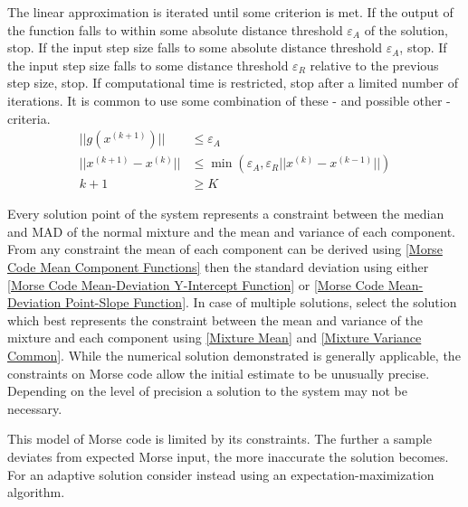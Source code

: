 \documentclass{article}
\begin{document}
The linear approximation is iterated until some criterion is met. If the output of the function falls to within some absolute distance threshold $\varepsilon_A$ of the solution, stop. If the input step size falls to some absolute distance threshold $\varepsilon_A$, stop. If the input step size falls to some distance threshold $\varepsilon_R$ relative to the previous step size, stop. If computational time is restricted, stop after a limited number of iterations. It is common to use some combination of these - and possible other - criteria.
%
\begin{align}\label{Newton's Method Stop Conditions}
||g(x^{(k+1)})|| &\leq \varepsilon_A \\
||x^{(k+1)} - x^{(k)}|| &\leq
    \min(\varepsilon_A, \varepsilon_R ||x^{(k)} - x^{(k-1)}||) \\
k + 1 &\geq K
\end{align}


Every solution point of the system represents a constraint between the median and MAD of the normal mixture and the mean and variance of each component. From any constraint the mean of each component can be derived using \ref{Morse Code Mean Component Functions} then the standard deviation using either \ref{Morse Code Mean-Deviation Y-Intercept Function} or \ref{Morse Code Mean-Deviation Point-Slope Function}. In case of multiple solutions, select the solution which best represents the constraint between the mean and variance of the mixture and each component using \ref{Mixture Mean} and \ref{Mixture Variance Common}. While the numerical solution demonstrated is generally applicable, the constraints on Morse code allow the initial estimate to be unusually precise. Depending on the level of precision a solution to the system may not be necessary.

This model of Morse code is limited by its constraints. The further a sample deviates from expected Morse input, the more inaccurate the solution becomes. For an adaptive solution consider instead using an expectation-maximization algorithm.


\printbibliography
\end{document}
